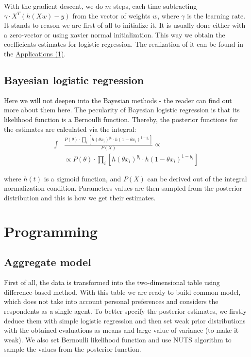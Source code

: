 \documentclass[a4paper, 12pt]{extreport}
\begin{document}
With the gradient descent, we do $m$ steps, each time subtracting $\gamma \cdot X^T(h(Xw) - y)$ from the vector of weights $w$, where $\gamma$ is the learning rate. It stands to reason we are first of all to
initialize it. It is usually done either with a zero-vector or using xavier normal initialization. This way we obtain the coefficients estimates for logistic regression. The realization of it can be found
in the \hyperref[app_1]{Applications (1)}. %

\subsection{Bayesian logistic regression}
Here we will not deepen into the Bayesian methods - the reader can find out more about them here. The pecularity of Bayesian logistic regression is that its likelihood function is a Bernoulli
function. Thereby, the posterior functions for the estimates are calculated via the integral:
\begin{align}
	\int& \frac{P(\theta) \cdot \prod_i [h(\theta x_i)^{y_i} \cdot h(1 - \theta x_i)^{1 - y_i}]}{P(X)} \propto \nonumber \\
	 &\propto P(\theta) \cdot \prod_i [h(\theta x_i)^{y_i} \cdot h(1 - \theta x_i)^{1 - y_i}]
\end{align}

where $h(t)$ is a sigmoid function, and $P(X)$ can be derived out of the integral normalization condition. Parameters values are then sampled from the posterior distribution and this is how we get their estimates.

\section{Programming}

\subsection{Aggregate model}
First of all, the data is transformed into the two-dimensional table using difference-based method. With this table we are ready to build common model, which does not take into account personal preferences and considers
the respondents as a single agent. To better specify the posterior estimates, we firstly deduce them with simple logistic regression and then set weak prior distributions with the obtained evaluations as means and
large value of variance (to make it weak). We also set Bernoulli likelihood function and use NUTS algorithm to sample the values from the posterior function. %
\end{document}

